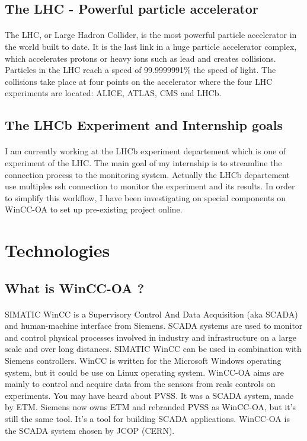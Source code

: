 \documentclass[a4paper, 10pt]{article}
\begin{document}
\subsection{The LHC - Powerful particle accelerator}
\paragraph{}
The LHC, or Large Hadron Collider, is the most powerful particle accelerator in the world built to date. It is the last link in a huge particle accelerator complex, which accelerates protons or heavy ions such as lead and creates collisions. Particles in the LHC reach a speed of 99.9999991\% the speed of light. The collisions take place at four points on the accelerator where the four LHC experiments are located: ALICE, ATLAS, CMS and LHCb.

\subsection{The LHCb Experiment and Internship goals}
\paragraph{}
I am currently working at the LHCb experiment departement which is one of experiment of the LHC.
The main goal of my internship is to streamline the connection process to the monitoring system. Actually the LHCb departement use multiples ssh connection to monitor the experiment and its results. In order to simplify this workflow, I have been investigating on special components on WinCC-OA to set up pre-existing project online.

\section{Technologies}
\subsection{What is WinCC-OA ?}
\paragraph{}
SIMATIC WinCC is a Supervisory Control And Data Acquisition (aka SCADA) and human-machine interface from Siemens. SCADA systems are used to monitor and control physical processes involved in industry and infrastructure on a large scale and over long distances. SIMATIC WinCC can be used in combination with Siemens controllers. WinCC is written for the Microsoft Windows operating system, but it could be use on Linux operating system. WinCC-OA aims are mainly to control and acquire data from the sensors from reals controls on experiments. You may have heard about PVSS. It was a SCADA system, made by ETM. Siemens now owns ETM and rebranded PVSS as WinCC-OA, but it's still the same tool. It's a tool for building SCADA applications. WinCC-OA is the SCADA system chosen by JCOP (CERN).
\end{document}
